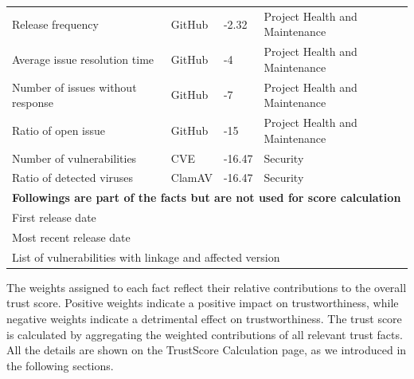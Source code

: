 \documentclass[10pt,conference]{IEEEtran}
\begin{document}
\begin{table}[!ht]
{\begin{tabular}{@{}p{4.5cm}lp{1cm}l@{}}
Release frequency & GitHub & -2.32 & Project Health and Maintenance \\
Average issue resolution time & GitHub & -4 & Project Health and Maintenance \\
Number of issues without response & GitHub & -7 & Project Health and Maintenance \\
Ratio of open issue & GitHub & -15 & Project Health and Maintenance \\
Number of vulnerabilities & CVE & -16.47 & Security \\
Ratio of detected viruses & ClamAV & -16.47 & Security
\\ \hline
\multicolumn{4}{l}{\textbf{Followings are part of the facts but are not used for score calculation}}\\ \hline

\multicolumn{4}{l}{First release date}     \\
\multicolumn{4}{l}{Most recent release date }   \\
\multicolumn{4}{l}{List of vulnerabilities with linkage and affected version}   \\
 \bottomrule
\end{tabular}%
}
\end{table}



The weights assigned to each fact reflect their relative contributions to the overall trust score. Positive weights indicate a positive impact on trustworthiness, while negative weights indicate a detrimental effect on trustworthiness. The trust score is calculated by aggregating the weighted contributions of all relevant trust facts. All the details are shown on the TrustScore Calculation page, as we introduced in the following sections.
\end{document}
